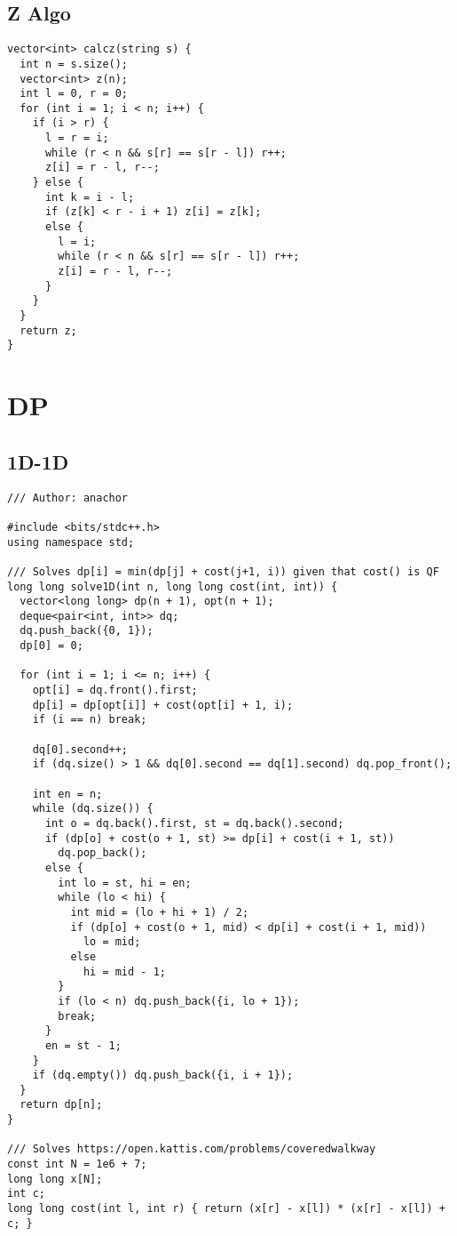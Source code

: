 \documentclass[FSZ,a4paper,onesided]{article}
\begin{document}
\begin{multicols*}{\COLS}
\subsection{Z Algo}
\begin{lstlisting}
vector<int> calcz(string s) {
  int n = s.size();
  vector<int> z(n);
  int l = 0, r = 0;
  for (int i = 1; i < n; i++) {
    if (i > r) {
      l = r = i;
      while (r < n && s[r] == s[r - l]) r++;
      z[i] = r - l, r--;
    } else {
      int k = i - l;
      if (z[k] < r - i + 1) z[i] = z[k];
      else {
        l = i;
        while (r < n && s[r] == s[r - l]) r++;
        z[i] = r - l, r--;
      }
    }
  }
  return z;
}
\end{lstlisting}
\section{DP}
\subsection{1D-1D}
\begin{lstlisting}
/// Author: anachor

#include <bits/stdc++.h>
using namespace std;

/// Solves dp[i] = min(dp[j] + cost(j+1, i)) given that cost() is QF
long long solve1D(int n, long long cost(int, int)) {
  vector<long long> dp(n + 1), opt(n + 1);
  deque<pair<int, int>> dq;
  dq.push_back({0, 1});
  dp[0] = 0;

  for (int i = 1; i <= n; i++) {
    opt[i] = dq.front().first;
    dp[i] = dp[opt[i]] + cost(opt[i] + 1, i);
    if (i == n) break;

    dq[0].second++;
    if (dq.size() > 1 && dq[0].second == dq[1].second) dq.pop_front();

    int en = n;
    while (dq.size()) {
      int o = dq.back().first, st = dq.back().second;
      if (dp[o] + cost(o + 1, st) >= dp[i] + cost(i + 1, st))
        dq.pop_back();
      else {
        int lo = st, hi = en;
        while (lo < hi) {
          int mid = (lo + hi + 1) / 2;
          if (dp[o] + cost(o + 1, mid) < dp[i] + cost(i + 1, mid))
            lo = mid;
          else
            hi = mid - 1;
        }
        if (lo < n) dq.push_back({i, lo + 1});
        break;
      }
      en = st - 1;
    }
    if (dq.empty()) dq.push_back({i, i + 1});
  }
  return dp[n];
}

/// Solves https://open.kattis.com/problems/coveredwalkway
const int N = 1e6 + 7;
long long x[N];
int c;
long long cost(int l, int r) { return (x[r] - x[l]) * (x[r] - x[l]) + c; }


\end{lstlisting}
\end{multicols*}
\end{document}
